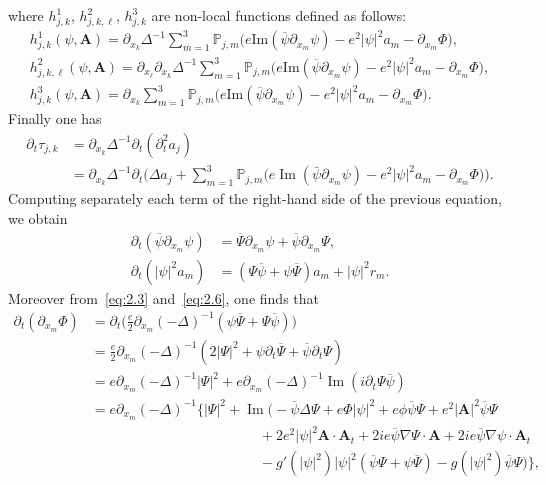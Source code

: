 \documentclass[AHL,Unicode,longabstracts]{cedram}
\newcommand{\BA}{\mathbf{A}}
\DeclareMathOperator{\IM}{Im}
\begin{document}
where $h^1_{j,k}$, $h_{j,k,\ell}^2$, $h^3_{j,k}$ are non-local functions defined as follows:
\begin{gather*}
h^1_{j,k}(\psi,\BA) =\partial_{x_k} \Delta^{-1}\sum_{m=1}^3 {\mathbb P}_{j,m}
\big(e\text{Im}(\overline{\psi}\partial_{x_m} \psi)-e^2|\psi|^2a_m -\partial_{x_m} \Phi \big),
\\
h^2_{j,k,\ell}(\psi,\BA) =\partial_{x_\ell} \partial_{x_k} \Delta^{-1}\sum_{m=1}^3{\mathbb P}_{j,m}
\big(e\text{Im}(\overline{\psi}\partial_{x_m} \psi)-e^2|\psi|^2a_m -\partial_{x_m} \Phi \big),
\\
h^3_{j,k}(\psi,\BA) =\partial_{x_k} \sum_{m=1}^3{\mathbb P}_{j,m}
\big(e\text{Im}(\overline{\psi}\partial_{x_m} \psi)-e^2|\psi|^2a_m -\partial_{x_m} \Phi \big).
\end{gather*}
Finally one has
\begin{align*}
\partial_t \tau_{j,k} &= \partial_{x_k} \Delta^{-1} \partial_t (\partial_t^2 a_j) \\
&= \partial_{x_k} \Delta^{-1} \partial_t
\Big(\Delta a_j + \sum_{m=1}^3 {\mathbb P}_{j,m}
\Big(e \IM (\bar{\psi} \partial_{x_m} \psi)-e^2|\psi|^2 a_m -\partial_{x_m} \Phi \Big) \Big).
\end{align*}
Computing separately each term of the right-hand side of the previous equation, we obtain
\begin{align*}
\partial_t(\overline{\psi}\partial_{x_m} \psi) &=\overline{\Psi}\partial_{x_m}\psi + \overline{\psi}\partial_{x_m} \Psi, \\
\partial_t(|\psi|^2a_m)&= (\Psi \overline{\psi}+\psi \overline{\Psi}) a_m + |\psi|^2 r_m.
\end{align*}
Moreover from~\eqref{eq:2.3} and~\eqref{eq:2.6}, one finds that
\begin{align*}
\partial_t (\partial_{x_m} \Phi) &= \partial_t \Big(\frac{e}{2} \partial_{x_m} (-\Delta)^{-1} (\psi \overline{\Psi} + \Psi \overline{\psi}) \Big) \\
&= \frac{e}{2} \partial_{x_m} (-\Delta)^{-1} (2|\Psi|^2+\psi \partial_t \overline{\Psi} +\overline{\psi} \partial_t \Psi) \\
&= e \partial_{x_m} (-\Delta)^{-1} |\Psi|^2 +e \partial_{x_m} (-\Delta)^{-1} \IM (i \partial_t \Psi \overline{\psi}) \\
&= e \partial_{x_m} (-\Delta)^{-1} \Big\{ |\Psi|^2 + \IM \Big(-\overline{\psi} \Delta \Psi +e \Phi |\psi|^2 +e \phi \overline{\psi} \Psi +e^2 |\BA|^2 \overline{\psi} \Psi \\
&\hspace{12em} + 2e^2 |\psi|^2 \BA \cdot \BA_t +2i e \overline{\psi} \nabla \Psi \cdot \BA +2i e \overline{\psi} \nabla \psi \cdot \BA_t \\
&\hspace{12em} -g'(|\psi|^2)|\psi|^2(\overline{\psi}\Psi+\psi\overline{\Psi}) - g(|\psi|^2) \overline{\psi} \Psi \Big) \Big\},
\end{align*}
\end{document}
